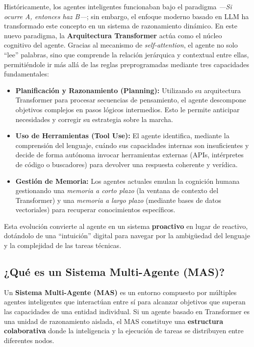 \documentclass[12pt,a4paper]{article}
\begin{document}
Históricamente, los agentes inteligentes funcionaban bajo el paradigma \textit{---Si ocurre A, entonces haz B---}; sin embargo, el enfoque moderno basado en LLM ha transformado este concepto en un sistema de razonamiento dinámico. En este nuevo paradigma, la \textbf{Arquitectura Transformer} actúa como el núcleo cognitivo del agente. Gracias al mecanismo de \textit{self-attention}, el agente no solo ``lee'' palabras, sino que comprende la relación jerárquica y contextual entre ellas, permitiéndole ir más allá de las reglas preprogramadas mediante tres capacidades fundamentales:

\begin{itemize}
    \item \textbf{Planificación y Razonamiento (Planning):} Utilizando su arquitectura Transformer para procesar secuencias de pensamiento, el agente descompone objetivos complejos en pasos lógicos intermedios. Esto le permite anticipar necesidades y corregir su estrategia sobre la marcha.
    
    \item \textbf{Uso de Herramientas (Tool Use):} El agente identifica, mediante la comprensión del lenguaje, cuándo sus capacidades internas son insuficientes y decide de forma autónoma invocar herramientas externas (APIs, intérpretes de código o buscadores) para devolver una respuesta coherente y verídica.
    
    \item \textbf{Gestión de Memoria:} Los agentes actuales emulan la cognición humana gestionando una \textit{memoria a corto plazo} (la ventana de contexto del Transformer) y una \textit{memoria a largo plazo} (mediante bases de datos vectoriales) para recuperar conocimientos específicos.
\end{itemize}

Esta evolución convierte al agente en un sistema \textbf{proactivo} en lugar de reactivo, dotándolo de una ``intuición'' digital para navegar por la ambigüedad del lenguaje y la complejidad de las tareas técnicas.

\subsection{¿Qué es un Sistema Multi-Agente (MAS)?}

Un \textbf{Sistema Multi-Agente (MAS)} es un entorno compuesto por múltiples agentes inteligentes que interactúan entre sí para alcanzar objetivos que superan las capacidades de una entidad individual. Si un agente basado en Transformer es una unidad de razonamiento aislada, el MAS constituye una \textbf{estructura colaborativa} donde la inteligencia y la ejecución de tareas se distribuyen entre diferentes nodos.
\end{document}

